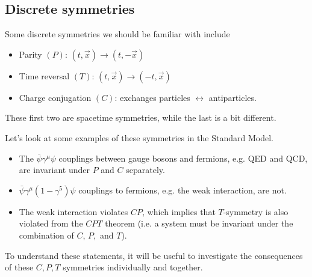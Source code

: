 \subsection*{Discrete symmetries}
Some discrete symmetries we should be familiar with include
\begin{itemize}
    \item Parity $(P)$: $(t,\vec x) \to (t,-\vec x)$
    \item Time reversal $(T)$: $(t,\vec x) \to (-t,\vec x)$
    \item Charge conjugation $(C)$: exchanges particles $\leftrightarrow$ antiparticles.
\end{itemize}
These first two are spacetime symmetries, while the last is a bit different.
\begin{exm}
    Let's look at some examples of these symmetries in the Standard Model.
    \begin{itemize}
        \item The $\bar \psi \gamma^\mu \psi$ couplings between gauge bosons and fermions, e.g. QED and QCD, are invariant under $P$ and $C$ separately.
        \item $\bar \psi \gamma^\mu(1-\gamma^5) \psi$ couplings to fermions, e.g. the weak interaction, are not.
        \item The weak interaction violates $CP$, which implies that $T$-symmetry is also violated from the $CPT$ theorem (i.e. a system must be invariant under the combination of $C$, $P,$ and $T$).
    \end{itemize}
\end{exm}
To understand these statements, it will be useful to investigate the consequences of these $C,P,T$ symmetries individually and together.
